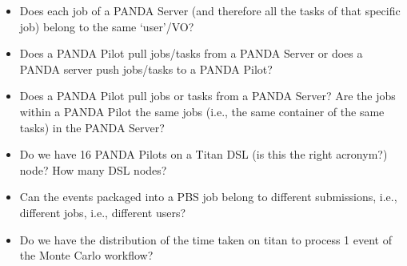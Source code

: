 \begin{itemize}
    \item Does each job of a PANDA Server (and therefore all the tasks of that specific job) belong to the same `user'/VO?
    \item Does a PANDA Pilot pull jobs/tasks from a PANDA Server or does a PANDA server push jobs/tasks to a PANDA Pilot?
    \item Does a PANDA Pilot pull jobs or tasks from a PANDA Server? Are the jobs within a PANDA Pilot the same jobs (i.e., the same container of the same tasks) in the PANDA Server?
    \item Do we have 16 PANDA Pilots on a Titan DSL (is this the right acronym?) node? How many DSL nodes?
    \item Can the events packaged into a PBS job belong to different submissions, i.e., different jobs, i.e., different users?
    \item Do we have the distribution of the time taken on titan to process 1 event of the Monte Carlo workflow?
\end{itemize}
